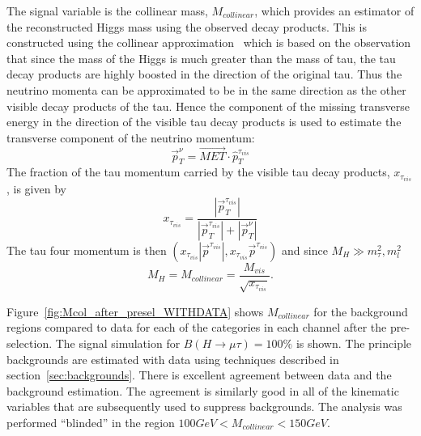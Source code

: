 \documentclass[oneside, letterpaper, oldfontcommands]{memoir}
\begin{document}
{{{The signal variable is the collinear mass, $M_{collinear}$, which provides an estimator of the reconstructed Higgs mass using the observed
decay products. This is constructed using the collinear approximation~\cite{Ellis:1987xu} which is based on
the observation that since the mass of the Higgs  is much greater than the mass of tau, the tau decay products are highly
boosted in the direction of the original tau. Thus the neutrino momenta  can be approximated to be in the same direction as
the other visible decay products of the tau. Hence the component of the missing transverse energy in the direction of the
visible tau decay products is used to estimate the transverse component of the neutrino momentum:
\begin{equation*}
\vec{p}_{T}^{\nu}=\vec{MET}\cdot\hat{p}_{T}^{\tau_{vis}}
\end{equation*}
The fraction of the tau momentum carried by the visible tau decay products, $x_{\tau_{vis}}$, is given by
\begin{equation*}
x_{\tau_{vis}}=\frac{|\vec{p}_{T}^{\tau_{vis}}|}{|\vec{p}_{T}^{\tau_{vis}}|+|\vec{p}_{T}^{\nu}|}
\end{equation*}
The tau four momentum is then $(x_{\tau_{vis}}|\vec{p}^{\tau_{vis}}|,x_{\tau_{vis}}\vec{p}^{\tau_{vis}})$ and since
$M_{H} \gg m_{\tau}^{2},m_{l}^{2} $
\begin{equation*}
M_{H}=M_{collinear}=\frac{M_{vis}}{\sqrt{x_{\tau_{vis}}}}.
\end{equation*}

Figure~\ref{fig:Mcol_after_presel_WITHDATA} shows $M_{collinear}$ for the background regions compared to data for each of the
categories in each channel after the pre-selection. The signal simulation for $B(H \rightarrow \mu \tau )=100\%$ is shown. The principle backgrounds are estimated with data using techniques described in
section~\ref{sec:backgrounds}.  There is excellent agreement between data and the background estimation. The agreement is similarly good in all of the kinematic variables that are subsequently used to suppress backgrounds. The analysis was performed ``blinded'' in the region $100 GeV < M_{collinear} < 150 GeV$.


}}}
\end{document}
